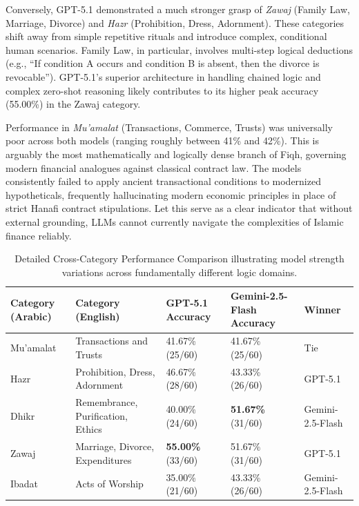 Conversely, GPT-5.1 demonstrated a much stronger grasp of \textit{Zawaj} (Family Law, Marriage, Divorce) and \textit{Hazr} (Prohibition, Dress, Adornment). These categories shift away from simple repetitive rituals and introduce complex, conditional human scenarios. Family Law, in particular, involves multi-step logical deductions (e.g., ``If condition A occurs and condition B is absent, then the divorce is revocable''). GPT-5.1's superior architecture in handling chained logic and complex zero-shot reasoning likely contributes to its higher peak accuracy (55.00\%) in the Zawaj category.

Performance in \textit{Mu'amalat} (Transactions, Commerce, Trusts) was universally poor across both models (ranging roughly between 41\% and 42\%). This is arguably the most mathematically and logically dense branch of Fiqh, governing modern financial analogues against classical contract law. The models consistently failed to apply ancient transactional conditions to modernized hypotheticals, frequently hallucinating modern economic principles in place of strict Hanafi contract stipulations. Let this serve as a clear indicator that without external grounding, LLMs cannot currently navigate the complexities of Islamic finance reliably.

\begin{table}[h!]
\centering
\begin{tabular}{p{3cm} p{4cm} p{2cm} p{3.5cm} p{2cm}}
\toprule
\textbf{Category (Arabic)} & \textbf{Category (English)} & \textbf{GPT-5.1 Accuracy} & \textbf{Gemini-2.5-Flash Accuracy} & \textbf{Winner} \\
\midrule
Mu'amalat & Transactions and Trusts & 41.67\% (25/60) & 41.67\% (25/60) & Tie \\
Hazr & Prohibition, Dress, Adornment & 46.67\% (28/60) & 43.33\% (26/60) & GPT-5.1 \\
Dhikr & Remembrance, Purification, Ethics & 40.00\% (24/60) & \textbf{51.67\%} (31/60) & Gemini-2.5-Flash \\
Zawaj & Marriage, Divorce, Expenditures & \textbf{55.00\%} (33/60) & 51.67\% (31/60) & GPT-5.1 \\
Ibadat & Acts of Worship & 35.00\% (21/60) & 43.33\% (26/60) & Gemini-2.5-Flash \\
\bottomrule
\end{tabular}
\caption{Detailed Cross-Category Performance Comparison illustrating model strength variations across fundamentally different logic domains.}
\label{tab:categories}
\end{table}

